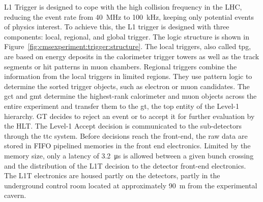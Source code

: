 L1 Trigger is designed to cope with the high collision frequency in the LHC, reducing the event rate from 40~MHz to 100~kHz, keeping only potential events of physics interest. To achieve this, the L1 trigger is designed with three components: local, regional, and global trigger. The logic structure is shown in Figure~\ref{fig:cmsexperiment:trigger:structure}. The local triggers, also called \acrfull{tpg}, are based on energy deposits in the calorimeter trigger towers as well as the track segments or hit patterns in muon chambers. Regional triggers combine the information from the local triggers in limited regions. They use pattern logic to determine the sorted trigger objects, such as electron or muon candidates. The \acrfull{gct} and \acrfull{gmt} determine the highest-rank calorimeter and muon objects across the entire experiment and transfer them to the \acrfull{gt}, the top entity of the Level-1 hierarchy. GT decides to reject an event or to accept it for further evaluation by the HLT. The Level-1 Accept decision is communicated to the sub-detectors through the \acrfull{ttc} system. Before decisions reach the front-end, the raw data are stored in FIFO pipelined memories in the front end electronics. Limited by the memory size, only a latency of \SI{3.2}{\us} is allowed between a given bunch crossing and the distribution of the L1T decision to the detector front-end electronics. The L1T electronics are housed partly on the detectors, partly in the underground control room located at approximately 90~m from the experimental cavern.


    

